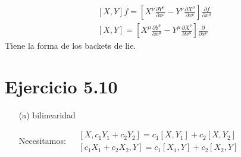 \documentclass{article}
\begin{document}
\[
\begin{gathered}
  [X,Y] f = \left[ X^{\nu} \frac{ \partial Y^{\mu}}{ \partial x^{\nu }} - Y^{\nu} \frac{ \partial X^{\mu} }{ \partial x^{\nu }} \right] \frac{ \partial f }{ \partial x^{\mu }} \\ 
   [X,Y] = \left[ X^{\mu} \frac{ \partial Y^{\nu }}{ \partial x^{\mu} } - Y^{\mu} \frac{ \partial X^{\nu }}{ \partial x^{\mu} } \right] \frac{ \partial }{ \partial x^{\nu }} 
\end{gathered}
\]
Tiene la forma de los backets de lie.

\section{Ejercicio 5.10 }
\begin{enumerate}
\item[(a)] bilinearidad

Necesitamos: $\begin{aligned}
  & [X, c_1 Y_1 + c_2 Y_2 ] = c_1[X,Y_1] + c_2 [ X,Y_2 ] \\ 
  & [c_1 X_1 + c_2 X_2, Y ] = c_1 [X_1, Y] + c_2 [ X_2, Y ] 
  \end{aligned}$

\[

\]
\end{enumerate}
\end{document}
